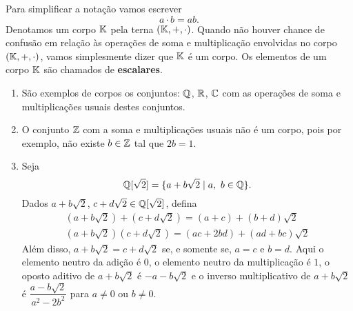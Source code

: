 Para simplificar a nota\c{c}\~ao vamos escrever
\[
a \cdot b = ab.
\]
Denotamos um corpo $\mathbb{K}$ pela terna $(\mathbb{K}, +, \cdot)$. Quando n\~ao houver chance de confus\~ao em rela\c{c}\~ao \`as opera\c{c}\~oes de soma e multiplica\c{c}\~ao envolvidas no corpo $(\mathbb{K}, +, \cdot)$, vamos simplesmente dizer que $\mathbb{K}$ \'e um corpo. Os elementos de um corpo $\mathbb{K}$ s\~ao chamados de \textbf{escalares}.

\begin{exemplo}
\begin{enumerate}
	\item S\~ao exemplos de corpos os conjuntos: $\mathbb{Q}$, $\mathbb{R}$, $\mathbb{C}$ com as opera\c{c}\~oes de soma e multiplica\c{c}\~oes usuais destes conjuntos.

	\item O conjunto $\mathbb{Z}$ com a soma e multiplica\c{c}\~oes usuais n\~ao \'e um corpo, pois por exemplo, n\~ao existe $b \in \mathbb{Z}$ tal que $2b = 1$.

	\item Seja
	\[
	\mathbb{Q}{[\sqrt{2}]} = \{a + b\sqrt{2} \mid a,\ b \in \mathbb{Q}\}.
	\]
	Dados $a + b\sqrt{2}$, $c + d\sqrt{2} \in \mathbb{Q}{[\sqrt{2}]}$, defina
	\begin{align*}
	(a + b\sqrt{2}) + (c + d\sqrt{2}) = (a + c) + (b + d)\sqrt{2}\\
	(a + b\sqrt{2})(c + d\sqrt{2}) = (ac + 2bd) + (ad + bc)\sqrt{2}
	\end{align*}
	Al\'em disso, $a + b\sqrt{2} = c + d\sqrt{2}$ se, e somente se, $a = c$ e $b = d$.
	Aqui o elemento neutro da adi\c{c}\~ao \'e $0$, o elemento neutro da multiplica\c{c}\~ao \'e $1$, o oposto aditivo de $a + b\sqrt{2}$ \'e $-a - b\sqrt{2}$ e o inverso multiplicativo de $a + b\sqrt{2}$ \'e $\dfrac{a - b\sqrt{2}}{a^2 - 2b^2}$ para $a \ne 0$ ou $b \ne 0$.

\end{enumerate}
\end{exemplo}

